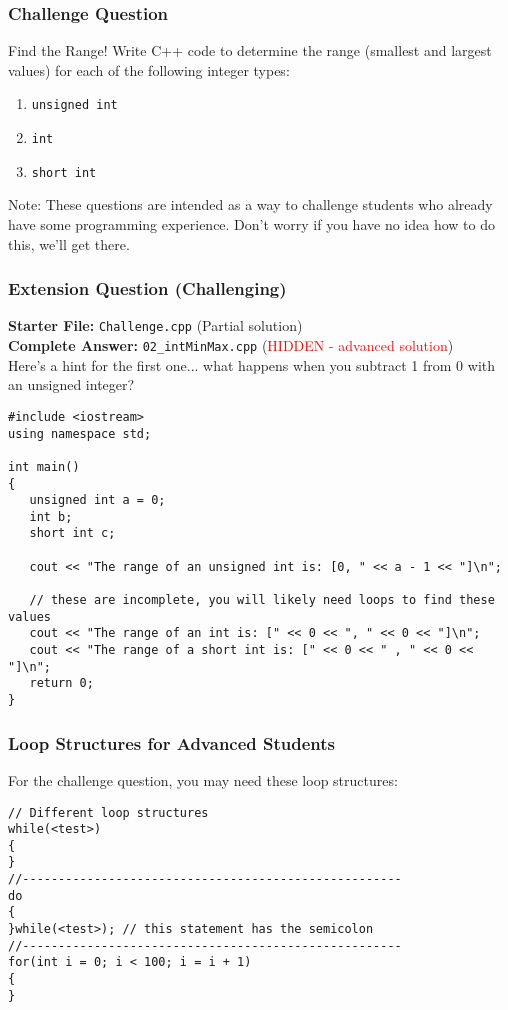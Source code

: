 \documentclass{beamer}
\begin{document}
\begin{frame}[fragile]
\frametitle{Challenge Question}
\begin{exampleblock}{Find the Range!}
Write C++ code to determine the range (smallest and largest values) for each of the following integer types:
\begin{enumerate}
    \item \texttt{unsigned int}
    \item \texttt{int}
    \item \texttt{short int}
\end{enumerate}
Note: These questions are intended as a way to challenge students who already have some programming experience. Don't worry if you have no idea how to do this, we'll get there.
\end{exampleblock}
\end{frame}

\begin{frame}[fragile]
\frametitle{Extension Question (Challenging)}
\textbf{Starter File:} \texttt{Challenge.cpp} (Partial solution)
\\\textbf{Complete Answer:} \texttt{02\_intMinMax.cpp} (\textcolor{red}{HIDDEN - advanced solution})
\\Here's a hint for the first one... what happens when you subtract 1 from 0 with an unsigned integer?
\pause
\begin{verbatim}
#include <iostream>
using namespace std;

int main()
{
   unsigned int a = 0;
   int b;
   short int c;
   
   cout << "The range of an unsigned int is: [0, " << a - 1 << "]\n";
   
   // these are incomplete, you will likely need loops to find these values
   cout << "The range of an int is: [" << 0 << ", " << 0 << "]\n";
   cout << "The range of a short int is: [" << 0 << " , " << 0 << "]\n";
   return 0;
}
\end{verbatim}
\end{frame}

\begin{frame}[fragile]
\frametitle{Loop Structures for Advanced Students}
For the challenge question, you may need these loop structures:
\begin{verbatim}
// Different loop structures
while(<test>)
{
}
//-----------------------------------------------------
do
{
}while(<test>); // this statement has the semicolon
//-----------------------------------------------------
for(int i = 0; i < 100; i = i + 1)
{
}
\end{verbatim}
\end{frame}
\end{document}

